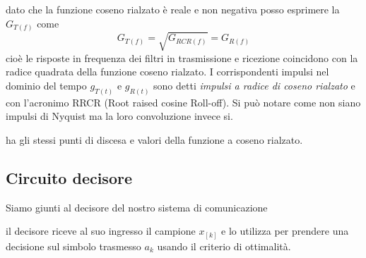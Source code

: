             dato che la funzione coseno rialzato è reale e non negativa posso esprimere la $G_{T(f)}$ come
            \[
                G_{T(f)} = \sqrt{G_{RCR(f)}} = G_{R(f)}    
            \] 
            cioè le risposte in frequenza dei filtri in trasmissione e ricezione coincidono con la radice
            quadrata della funzione coseno rialzato. I corrispondenti impulsi nel dominio del tempo 
            $g_{T(t)}$ e $g_{R(t)}$ sono detti \emph{impulsi a radice di coseno rialzato} e con l'acronimo RRCR
            (Root raised cosine Roll-off). Si può notare come non siano impulsi di Nyquist ma la loro convoluzione 
            invece si.
            \begin{figure}[H]
                \centering
                \hfill
            \end{figure}           
            ha gli stessi punti di discesa e valori della funzione a coseno rialzato.
    \subsection{Circuito decisore}
        Siamo giunti al decisore del nostro sistema di comunicazione
        \begin{figure}[H]
            \centering
        \end{figure}        
        il decisore riceve al suo ingresso il campione $x_{[k]}$ e lo utilizza per prendere una decisione sul simbolo trasmesso
        $a_k$ usando il criterio di ottimalità.
